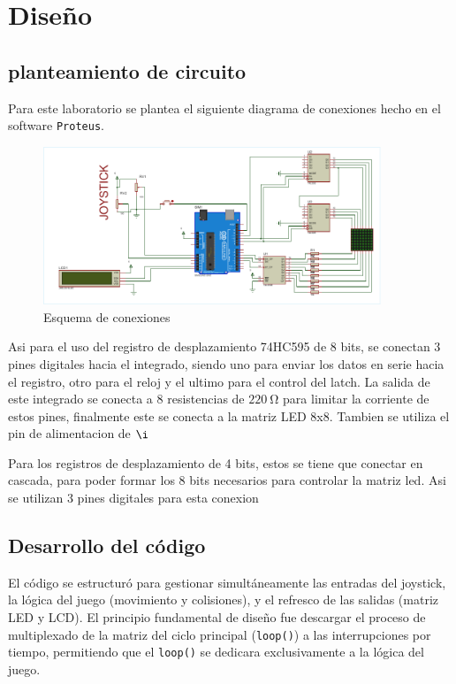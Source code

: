 \section{Diseño}

\subsection{planteamiento de circuito}
Para este laboratorio se plantea el siguiente diagrama de conexiones hecho en el software \texttt{Proteus}.
\begin{figure}[h!]
    \centering
    \includegraphics[width=0.9\textwidth]{Diagramas/xfcolor_cropped.pdf}
    \caption{Esquema de conexiones}
    \label{fig:esquema}
\end{figure}

Asi para el uso del registro de desplazamiento 74HC595 de 8 bits, se conectan 3 pines digitales hacia el integrado, siendo uno para enviar los datos en serie 
hacia el registro, otro para el reloj y el ultimo para el control del latch. La salida de este integrado se conecta a 8 resistencias de $\SI{220}{\ohm}$
para limitar la corriente de estos pines, finalmente este se conecta a la matriz LED 8x8. Tambien se utiliza el pin de alimentacion de $\i$

Para los registros de desplazamiento de 4 bits, estos se tiene que conectar en cascada, para poder formar los 8 bits necesarios para controlar la matriz led.
Asi se utilizan 3 pines digitales para esta conexion

\subsection{Desarrollo del código}
El código se estructuró para gestionar simultáneamente las entradas del joystick, la lógica del juego (movimiento y colisiones), y el refresco de las salidas (matriz LED y LCD). El principio fundamental de diseño fue descargar el proceso de multiplexado de la matriz del ciclo principal (\texttt{loop()}) a las interrupciones por tiempo, permitiendo que el \texttt{loop()} se dedicara exclusivamente a la lógica del juego.




